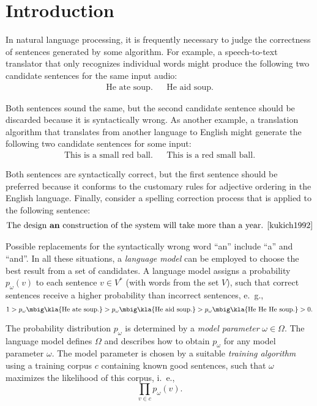 \chapter{Introduction}

In natural language processing, it is frequently necessary to judge the
correctness of sentences generated by some algorithm. For example, a
speech-to-text translator that only recognizes individual words might produce
the following two candidate sentences for the same input audio:
\begin{align*}
 \text{He ate soup.} &&
 \text{He aid soup.}
\end{align*}

Both sentences sound the same, but the second candidate sentence should be
discarded because it is syntactically wrong. As another example, a translation
algorithm that translates from another language to English might generate the
following two candidate sentences for some input:
\begin{align*}
 \text{This is a small red ball.} &&
 \text{This is a red small ball.}
\end{align*}

Both sentences are syntactically correct, but the first sentence should be
preferred because it conforms to the customary rules for adjective ordering in
the English language. Finally, consider a spelling correction process that is
applied to the following sentence:
\begin{align*}
 \text{The design \textbf{an} construction of the system will take more than a year. \cite{kukich1992}}
\end{align*}

Possible replacements for the syntactically wrong word ``an'' include ``a'' and
``and''. In all these situations, a \emph{language model} can be employed to
choose the best result from a set of candidates.
\cite{stolcke2002,youngetal2005} A language model assigns a probability $p_\omega(v)$
to each sentence $v\in V^*$ (with words from the set $V$), such that
correct sentences receive a higher probability than incorrect sentences, e.~g.,
\[
 1 > p_\omega\mbig\kla{\text{He ate soup.}} > p_\omega\mbig\kla{\text{He aid soup.}} > p_\omega\mbig\kla{\text{He He He soup.}} > 0.
\]

The probability distribution $p_\omega$ is determined by a \emph{model
parameter} $\omega\in\Omega$. The language model defines $\Omega$ and describes
how to obtain $p_\omega$ for any model parameter $\omega$. The model parameter
is chosen by a suitable \emph{training algorithm} using a training corpus $c$
containing known good sentences, such that $\omega$ maximizes the likelihood of
this corpus, i.~e.,
\[
 \prod_{v\in c} p_\omega(v).
\]

